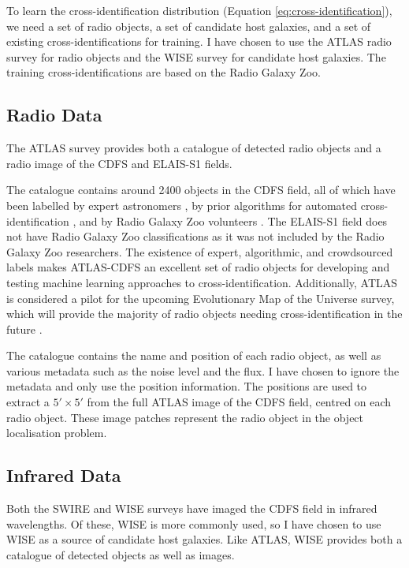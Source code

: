   To learn the cross-identification distribution (Equation \ref{eq:cross-identification}), we need a set of radio objects, a set of candidate host galaxies, and a set of existing cross-identifications for training. I have chosen to use the ATLAS radio survey for radio objects and the WISE survey for candidate host galaxies. The training cross-identifications are based on the Radio Galaxy Zoo.

  \subsection{Radio Data}
  \label{ssec:radio-data}

    The ATLAS survey \citep{franzen15}  provides both a catalogue of detected radio objects and a radio image of the CDFS and ELAIS-S1 fields.

    The catalogue contains around 2400 objects in the CDFS field, all of which have been labelled by expert astronomers \citep{norris06}, by prior algorithms for automated cross-identification \citep{fan15}, and by Radio Galaxy Zoo volunteers \citep{banfield15}. The ELAIS-S1 field does not have Radio Galaxy Zoo classifications as it was not included by the Radio Galaxy Zoo researchers. The existence of expert, algorithmic, and crowdsourced labels makes ATLAS-CDFS an excellent set of radio objects for developing and testing machine learning approaches to cross-identification. Additionally, ATLAS is considered a pilot for the upcoming Evolutionary Map of the Universe survey, which will provide the majority of radio objects needing cross-identification in the future \citep{banfield15}.


    The catalogue contains the name and position of each radio object, as well as various metadata such as the noise level and the flux. I have chosen to ignore the metadata and only use the position information. The positions are used to extract a $5' \times 5'$ from the full ATLAS image of the CDFS field, centred on each radio object. These image patches represent the radio object in the object localisation problem.

  \subsection{Infrared Data}

    Both the SWIRE and WISE surveys have imaged the CDFS field in infrared wavelengths. Of these, WISE is more commonly used, so I have chosen to use WISE as a source of candidate host galaxies. Like ATLAS, WISE provides both a catalogue of detected objects as well as images.

